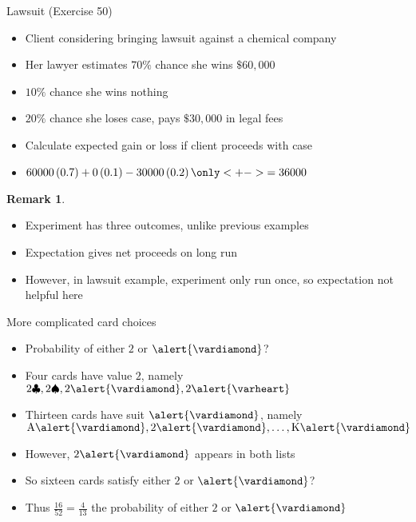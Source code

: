 \documentclass[handout]{beamer}
\theoremstyle{definition}
\newtheorem{remark}{Remark}
\begin{document}
\begin{frame}{Lawsuit (Exercise 50)}
\begin{itemize}
\item Client considering bringing lawsuit against a chemical company
\item Her lawyer estimates $70\%$ chance she wins $\$60,000$
\item $10\%$ chance she wins nothing
\item $20\%$ chance she loses case, pays $\$30,000$ in legal fees
\item Calculate expected gain or loss if client proceeds with case
\item $60000\left(0.7\right)
+0\left(0.1\right)-30000\left(0.2\right)
\only<+->{=36000}$
\end{itemize}
\begin{remark}
\begin{itemize}
\item Experiment has \alert{three} outcomes, unlike previous examples
\item Expectation gives net proceeds \alert{on long run}
\item However, in lawsuit example, experiment only run once,
so expectation not helpful here
\end{itemize}
\end{remark}
\end{frame}

\begin{frame}{More complicated card choices}
\begin{itemize}
\item Probability of \alert{either} $2$ or $\alert{\vardiamond}$?
\item Four cards have value $2$, namely
$2\clubsuit, 2\spadesuit, 2\alert{\vardiamond}, 2\alert{\varheart}$
\item Thirteen cards have suit $\alert{\vardiamond}$, namely
$\text{A}\alert{\vardiamond},2\alert{\vardiamond},\ldots,
\text{K}\alert{\vardiamond}$
\item However, $2\alert{\vardiamond}$ appears in \alert{both} lists
\item So \alert{sixteen} cards satisfy \alert{either} $2$ or $\alert{\vardiamond}$?
\item Thus $\frac{16}{52}=\frac{4}{13}$ the probability of
\alert{either} $2$ or $\alert{\vardiamond}$
\end{itemize}
\end{frame}
\end{document}
